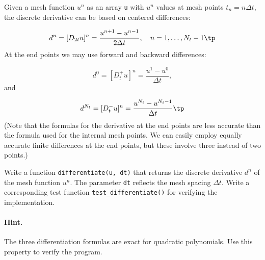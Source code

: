 \documentclass[graybox,sectrefs,envcountresetchap,open=right,final]{svmonodo}
\makeatletter
\newenvironment{doconceexercise}{}{}
\newcounter{doconceexercisecounter}%
\newcommand\listofexercises{
\chapter*{List of Exercises, Problems, and Projects
          \@mkboth{List of Exercises, Problems, and Projects}{List of Exercises, Problems, and Projects}}
\markboth{List of Exercises, Problems, and Projects}{List of Exercises, Problems, and Projects}
\@starttoc{loe}
}
\makeatother
\begin{document}
\begin{doconceexercise}

                
\label{decay:exer:dudt}

  

Given a mesh function $u^n$ as an array \texttt{u} with $u^n$ values at mesh
points $t_n=n\Delta t$, the discrete derivative can be based on
centered differences:

\begin{equation}
d^n = [D_{2t}u]^n =
\frac{u^{n+1}-u^{n-1}}{2\Delta t},\quad n=1,\ldots,N_t-1\tp
\label{decay:exer:dudt:D2t}
\end{equation}
At the end points we may use forward and backward differences:

\[ d^0 = [D_t^+u]^n = \frac{u^{1}-u^{0}}{\Delta t},\]
and

\[ d^{N_t} = [D_t^-u]^n = \frac{u^{N_t}-u^{N_t-1}}{\Delta t}\tp\]
(Note that the formulas for the derivative at the end points are
less accurate than the formula used for the internal mesh points.
We can easily employ equally accurate finite differences at the end
points, but these involve three instead of two points.)

Write a function
\texttt{differentiate(u, dt)} that returns the discrete derivative $d^n$ of the
mesh function $u^n$. The parameter \texttt{dt} reflects the
mesh spacing $\Delta t$. Write a corresponding test function
\Verb!test_differentiate()! for verifying the implementation.


\paragraph{Hint.}
The three differentiation formulas are
exact for quadratic polynomials. Use this property to verify the program.





\end{doconceexercise}
\end{document}
